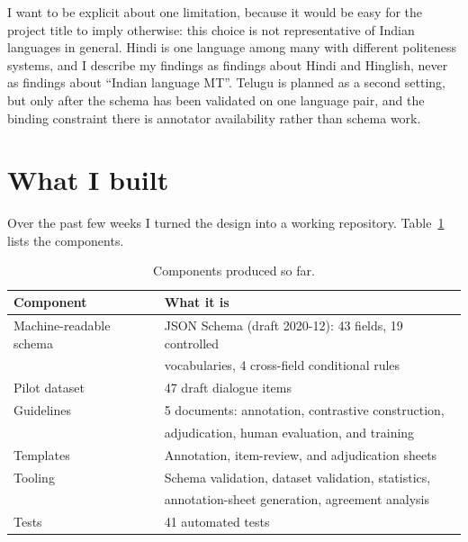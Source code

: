 \documentclass[11pt]{article}
\begin{document}
I want to be explicit about one limitation, because it would be easy for the
project title to imply otherwise: this choice is not representative of Indian
languages in general. Hindi is one language among many with different politeness
systems, and I describe my findings as findings about Hindi and Hinglish, never as
findings about ``Indian language MT''. Telugu is planned as a second setting, but
only after the schema has been validated on one language pair, and the binding
constraint there is annotator availability rather than schema work.

\section{What I built}

Over the past few weeks I turned the design into a working repository.
Table~\ref{tab:built} lists the components.

\begin{table}[h]
\centering
\small
\begin{tabular}{@{}ll@{}}
\toprule
\textbf{Component} & \textbf{What it is} \\
\midrule
Machine-readable schema & JSON Schema (draft 2020-12): 43 fields, 19 controlled \\
                        & vocabularies, 4 cross-field conditional rules \\
Pilot dataset           & 47 draft dialogue items \\
Guidelines              & 5 documents: annotation, contrastive construction, \\
                        & adjudication, human evaluation, and training \\
Templates               & Annotation, item-review, and adjudication sheets \\
Tooling                 & Schema validation, dataset validation, statistics, \\
                        & annotation-sheet generation, agreement analysis \\
Tests                   & 41 automated tests \\
\bottomrule
\end{tabular}
\caption{Components produced so far.}
\label{tab:built}
\end{table}
\end{document}
